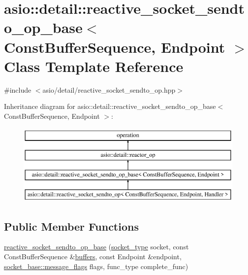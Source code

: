 \hypertarget{classasio_1_1detail_1_1reactive__socket__sendto__op__base}{}\section{asio\+:\+:detail\+:\+:reactive\+\_\+socket\+\_\+sendto\+\_\+op\+\_\+base$<$ Const\+Buffer\+Sequence, Endpoint $>$ Class Template Reference}
\label{classasio_1_1detail_1_1reactive__socket__sendto__op__base}


{\ttfamily \#include $<$asio/detail/reactive\+\_\+socket\+\_\+sendto\+\_\+op.\+hpp$>$}

Inheritance diagram for asio\+:\+:detail\+:\+:reactive\+\_\+socket\+\_\+sendto\+\_\+op\+\_\+base$<$ Const\+Buffer\+Sequence, Endpoint $>$\+:\begin{figure}[H]
\begin{center}
\leavevmode
\includegraphics[height=4.000000cm]{classasio_1_1detail_1_1reactive__socket__sendto__op__base}
\end{center}
\end{figure}
\subsection*{Public Member Functions}
\begin{DoxyCompactItemize}
\item 
\hyperlink{classasio_1_1detail_1_1reactive__socket__sendto__op__base_ae077d3ce1544e50a7036702e4b9896d1}{reactive\+\_\+socket\+\_\+sendto\+\_\+op\+\_\+base} (\hyperlink{namespaceasio_1_1detail_a6798c771dd84b79798b1a08150706ea9}{socket\+\_\+type} socket, const Const\+Buffer\+Sequence \&\hyperlink{group__async__read_ga54dede45c3175148a77fe6635222c47d}{buffers}, const Endpoint \&endpoint, \hyperlink{classasio_1_1socket__base_ac3cf77465dfedfe1979b5415cf32cc94}{socket\+\_\+base\+::message\+\_\+flags} flags, func\+\_\+type complete\+\_\+func)
\end{DoxyCompactItemize}
